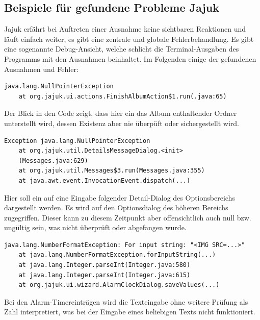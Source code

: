 \subsection{Beispiele für gefundene Probleme Jajuk}

Jajuk erfährt bei Auftreten einer Ausnahme keine sichtbaren
Reaktionen und läuft einfach weiter, es gibt eine
zentrale und globale Fehlerbehandlung. Es gibt eine sogenannte
\glqq{}Debug-Ansicht\grqq{}, welche schlicht die Terminal-Ausgaben
des Programms mit den Ausnahmen beinhaltet. Im Folgenden
einige der gefundenen Ausnahmen und Fehler:

\begin{lstlisting}[float=!ht,label=fmjson,caption={Ausnahme Jajuk beim Schliessen eines Albums}]
java.lang.NullPointerException
	at org.jajuk.ui.actions.FinishAlbumAction$1.run(.java:65)
\end{lstlisting}

Der Blick in den Code zeigt, dass hier ein das Album enthaltender Ordner unterstellt wird, dessen Existenz
aber nie überpüft oder sichergestellt wird.

\begin{lstlisting}[float=!ht,label=fmjson,caption={Ausnahme Jajuk Detail-Dialog}]
Exception java.lang.NullPointerException
	at org.jajuk.util.DetailsMessageDialog.<init>
	(Messages.java:629)
	at org.jajuk.util.Messages$3.run(Messages.java:355)
	at java.awt.event.InvocationEvent.dispatch(...)
\end{lstlisting}
	
Hier soll ein auf eine Eingabe folgender Detail-Dialog des Optionsbereichs
dargestellt werden. Es wird auf den Optionsdialog des höheren Bereichs zugegriffen.
Dieser kann zu diesem Zeitpunkt aber offensichtlich auch null bzw. ungültig sein,
was nicht überprüft oder abgefangen wurde.

\begin{lstlisting}[float=!ht,label=fmjson,caption={Ausnahme Jajuk ein Eingabe einer Nichtzahl}]
java.lang.NumberFormatException: For input string: "<IMG SRC=...>"
	at java.lang.NumberFormatException.forInputString(...)
	at java.lang.Integer.parseInt(Integer.java:580)
	at java.lang.Integer.parseInt(Integer.java:615)
	at org.jajuk.ui.wizard.AlarmClockDialog.saveValues(...)
\end{lstlisting}
	
Bei den Alarm-Timereinträgen wird die Texteingabe ohne weitere Prüfung
als Zahl interpretiert, was bei der Eingabe eines beliebigen Texts
nicht funktioniert.

